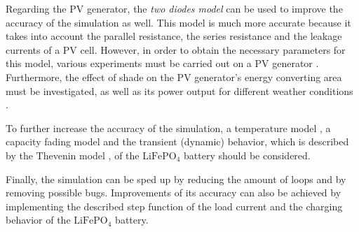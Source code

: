 Regarding the PV generator, the \emph{two diodes model} can be used to improve the accuracy of the \MATLAB simulation as well. This model is much more accurate because it takes into account the parallel resistance, the series resistance and the leakage currents of a PV cell. However, in order to obtain the necessary parameters for this model, various experiments must be carried out on a PV generator \cite{Mertens:2015, Wagner:2018}. Furthermore, the effect of shade on the PV generator's energy converting area must be investigated, as well as its power output for different weather conditions \cite{Mertens:2015}.

To further increase the accuracy of the \MATLAB simulation, a temperature model \cite{Hausmann:2013, Ala-A.-Hussein:2015, Chin:2018}, a capacity fading model \cite{Li:2018} and the transient (dynamic) behavior, which is described by the Thevenin model \cite{He:2011, Rahmoun:2012, Hentunen:2014, Li:2018, Hinz:2019, Hossain:2019, Saldana:2019}, of the $\mathrm{LiFePO}_4$ battery should be considered.

Finally, the \MATLAB simulation can be sped up by reducing the amount of  loops and by removing possible bugs. Improvements of its accuracy can also be achieved by implementing the described step function of the load current and the charging behavior of the $\mathrm{LiFePO}_4$ battery. 
